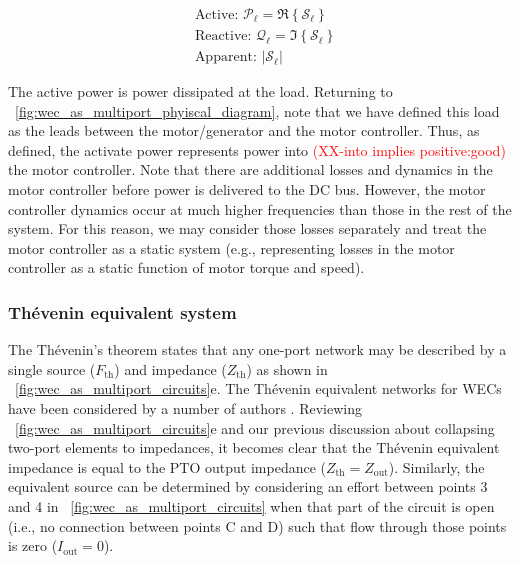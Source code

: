 \documentclass[lettersize,journal]{IEEEtran}
\newcommand{\rc}[1]{\textcolor{red}{#1}}
\begin{document}
\begin{subequations}
\begin{align}
&\textrm{Active: } \mathcal{P}_{\ell} = \Re \left\{ \mathcal{S}_{\ell} \right\} \\[0.5em]
&\textrm{Reactive: } \mathcal{Q}_{\ell} = \Im \left\{ \mathcal{S}_{\ell} \right\} \\[0.5em]
&\textrm{Apparent: } | \mathcal{S}_{\ell} |
\end{align}
\label{eq:load_power_types}
\end{subequations}

\noindent{}The active power is power dissipated at the load.
Returning to \figurename~\ref{fig:wec_as_multiport_phyiscal_diagram}, note that we have defined this load as the leads between the motor/generator and the motor controller.
Thus, as defined, the activate power represents power into \rc{(XX-into implies positive:good)} the motor controller.
Note that there are additional losses and dynamics in the motor controller before power is delivered to the DC bus.
However, the motor controller dynamics occur at much higher frequencies than those in the rest of the system.
For this reason, we may consider those losses separately and treat the motor controller as a static system (e.g., representing losses in the motor controller as a static function of motor torque and speed).

\subsubsection{Th\'{e}venin equivalent system}\label{sec:thevenin_equivalent_system}

The Th\'{e}venin's theorem \cite{Thevenin:1883aa} states that any one-port network may be described by a single source ($F_{\textrm{th}}$) and impedance ($Z_{\textrm{th}}$) as shown in \figurename~\ref{fig:wec_as_multiport_circuits}e.
The Th\'{e}venin equivalent networks for WECs have been considered by a number of authors \cite{Bacelli:2021aa,Blanco:2019aa,Bubbar:2018aa,Lewis:2013aa}.
Reviewing \figurename~\ref{fig:wec_as_multiport_circuits}e and our previous discussion about collapsing two-port elements to impedances, it becomes clear that the Th\'{e}venin equivalent impedance is equal to the PTO output impedance ($Z_{\textrm{th}} = Z_{\textrm{out}}$).
Similarly, the equivalent source can be determined by considering an effort between points 3 and 4 in \figurename~\ref{fig:wec_as_multiport_circuits} when that part of the circuit is open (i.e., no connection between points C and D) such that flow through those points is zero ($I_{\textrm{out}}=0$).
\end{document}
